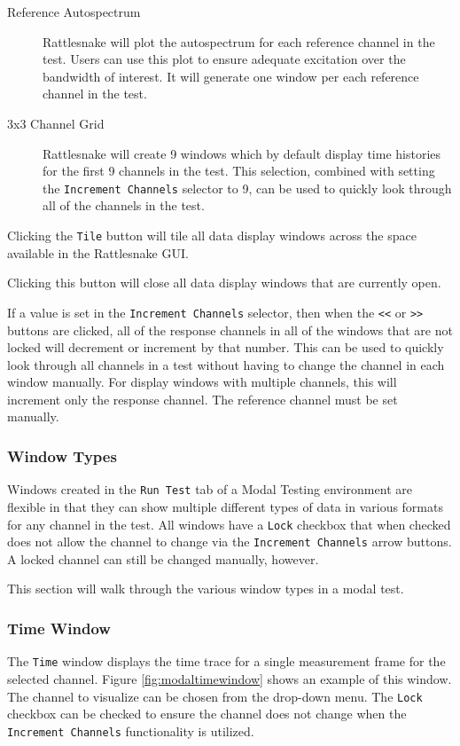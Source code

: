 \documentclass[pdf,12pt,report]{SANDreport}
\newcommand{\inlineCode}{\lstinline[basicstyle=\bfseries\ttfamily]}
\begin{document}
\begin{description}
\begin{description}
            \item[Reference Autospectrum] Rattlesnake will plot the autospectrum for each reference channel in the test.  Users can use this plot to ensure adequate excitation over the bandwidth of interest.  It will generate one window per each reference channel in the test.
            \item[3x3 Channel Grid] Rattlesnake will create 9 windows which by default display time histories for the first 9 channels in the test.  This selection, combined with setting the \inlineCode{Increment Channels} selector to 9, can be used to quickly look through all of the channels in the test.
        \end{description}
        \item[Tile] Clicking the \inlineCode{Tile} button will tile all data display windows across the space available in the Rattlesnake \ac{GUI}.
        \item[Close All] Clicking this button will close all data display windows that are currently open.
        \item[Increment Channels] If a value is set in the \inlineCode{Increment Channels} selector, then when the \inlineCode{<<} or \inlineCode{>>} buttons are clicked, all of the response channels in all of the windows that are not locked will decrement or increment by that number.  This can be used to quickly look through all channels in a test without having to change the channel in each window manually.  For display windows with multiple channels, this will increment only the response channel.  The reference channel must be set manually.
    \end{description}
    
    \subsubsection{Window Types}
    Windows created in the \inlineCode{Run Test} tab of a Modal Testing environment are flexible in that they can show multiple different types of data in various formats for any channel in the test.  All windows have a \inlineCode{Lock} checkbox that when checked does not allow the channel to change via the \inlineCode{Increment Channels} arrow buttons.  A locked channel can still be changed manually, however.
    
    This section will walk through the various window types in a modal test.
    
    \subsubsection{Time Window}
    The \inlineCode{Time} window displays the time trace for a single measurement frame for the selected channel.  Figure \ref{fig:modaltimewindow} shows an example of this window.  The channel to visualize can be chosen from the drop-down menu.  The \inlineCode{Lock} checkbox can be checked to ensure the channel does not change when the \inlineCode{Increment Channels} functionality is utilized.
    
\end{document}
